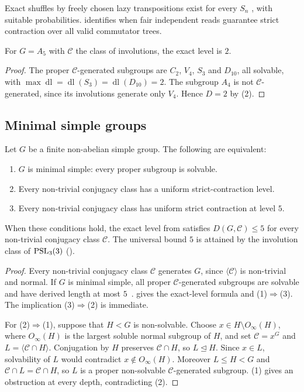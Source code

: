 Exact shuffles by freely chosen lazy transpositions exist for every $S_n$
\cite{AngelHolroyd2018}, with suitable probabilities.
 identifies when fair independent reads guarantee strict
contraction over all valid commutator trees.

\begin{corollary}
\label{cor:A5}
For $G=A_5$ with $\mathcal{C}$ the class of involutions, the exact level
is $2$.
\end{corollary}
\begin{proof}
The proper $\mathcal{C}$-generated subgroups are $C_2$, $V_4$, $S_3$ and $D_{10}$, all
solvable, with $\max\operatorname{dl}=\operatorname{dl}(S_3)=\operatorname{dl}(D_{10})=2$.
The subgroup $A_4$ is not $\mathcal{C}$-generated, since its involutions generate only
$V_4$. Hence $D=2$ by (2).
\end{proof}

\subsection{Minimal simple groups}

\begin{corollary}
\label{cor:minsimple}
Let $G$ be a finite non-abelian simple group. The following are equivalent:
\begin{enumerate}[nosep,leftmargin=1.6em]
\item $G$ is minimal simple: every proper subgroup is solvable.
\item Every non-trivial conjugacy class has a uniform strict-contraction
level.
\item Every non-trivial conjugacy class has uniform strict contraction at
level $5$.
\end{enumerate}
When these conditions hold, the exact level from 
satisfies $D(G,\mathcal C)\le5$ for every non-trivial conjugacy class
$\mathcal C$.
The universal bound $5$ is attained by the involution class of
$\operatorname{PSL}_3(3)$ ().
\end{corollary}
\begin{proof}
Every non-trivial conjugacy class $\mathcal C$ generates $G$, since
$\langle\mathcal C\rangle$ is non-trivial and normal. If $G$ is minimal
simple, all proper $\mathcal C$-generated subgroups are solvable and have
derived length at most $5$~\cite[Remark 2.3]{ErsoyTortoraTota2014}.
 gives the exact-level formula and (1)$\Rightarrow$(3).
The implication (3)$\Rightarrow$(2) is immediate.

For (2)$\Rightarrow$(1), suppose that $H<G$ is non-solvable. Choose
$x\in H\setminus O_\infty(H)$, where $O_\infty(H)$ is the largest soluble
normal subgroup of $H$, and set $\mathcal C=x^G$ and
$L=\langle\mathcal C\cap H\rangle$. Conjugation by $H$ preserves
$\mathcal C\cap H$, so $L\trianglelefteq H$. Since $x\in L$, solvability
of $L$ would contradict $x\notin O_\infty(H)$. Moreover $L\le H<G$ and
$\mathcal C\cap L=\mathcal C\cap H$, so $L$ is a proper non-solvable
$\mathcal C$-generated subgroup. (1) gives an
obstruction at every depth, contradicting (2).
\end{proof}

